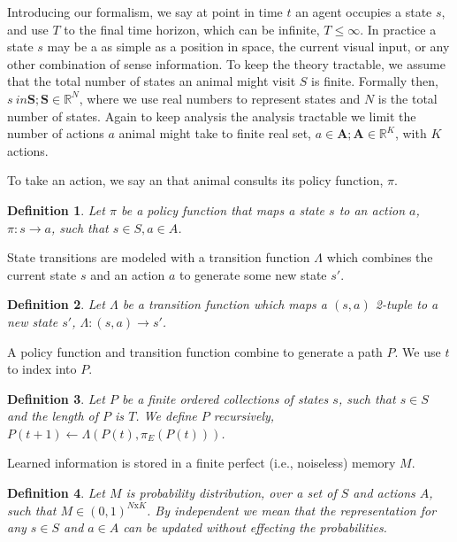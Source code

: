 \documentclass[9pt,twocolumn,twoside]{pnas-new}
\newtheorem{definition}{Definition}
\begin{document}
Introducing our formalism, we say at point in time $t$ an agent occupies a state $s$, and use $T$ to the final time horizon, which can be infinite, $T \leq \infty$. In practice a state $s$ may be a as simple as a position in space, the current visual input, or any other combination of sense information. To keep the theory tractable, we assume that the total number of states an animal might visit $S$ is finite. Formally then, $s\ in \textbf{S}; \textbf{S} \in \mathbb{R}^N$, where we use real numbers to represent states and $N$ is the total number of states. Again to keep analysis the analysis tractable we limit the number of actions $a$ animal might take to finite real set, $a \in \textbf{A}; \textbf{A} \in \mathbb{R}^K$, with $K$ actions. 

To take an action, we say an that animal consults its policy function, $\pi$. 

\begin{definition}
    Let $\pi$ be a policy function that maps a state $s$ to an action $a$, $\pi : s \rightarrow a$, such that $s \in S, a \in A$.
\end{definition}

State transitions are modeled with a transition function $\Lambda$ which combines the current state $s$ and an action $a$ to generate some new state $s'$.

\begin{definition}
    Let $\Lambda$ be a transition function which maps a $(s,a)$ 2-tuple to a new state $s'$, $\Lambda : (s, a) \rightarrow s'$.     
\end{definition}

A policy function and transition function combine to generate a path $P$. We use $t$ to index into $P$. 

\begin{definition}
    Let $P$ be a finite ordered collections of states $s$, such that $s \in S$ and the length of $P$ is $T$. We define $P$ recursively, $P(t+1) \leftarrow \Lambda(P(t), \pi_E(P(t)))$.
\end{definition}

Learned information is stored in a finite perfect (i.e., noiseless) memory $M$. 
    
\begin{definition}
    Let $M$ is probability distribution, over a set of $S$ and actions $A$, such that $M \in (0, 1)^{N\text{x}K}$. By independent we mean that the representation for any $s \in S$ and $a \in A$ can be updated without effecting the probabilities. 
\end{definition}
\end{document}
